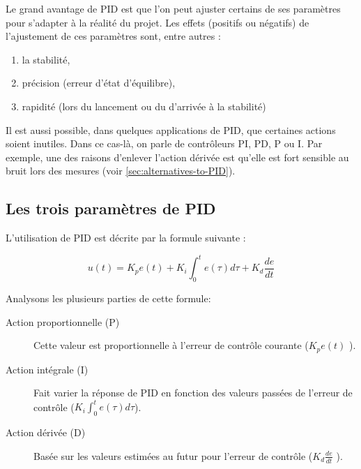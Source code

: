 Le grand avantage de PID est que l'on peut ajuster certains de ses paramètres pour s'adapter à la réalité du projet.
Les effets (positifs ou négatifs) de l'ajustement de ces paramètres sont, entre autres \cite{zhong2006pid} :
\begin{enumerate}
\item la stabilité,
\item précision (erreur d'état d'équilibre),
\item rapidité (lors du lancement ou du d'arrivée à la stabilité)
\end{enumerate}

Il est aussi possible, dans quelques applications de PID, que certaines actions soient inutiles.
Dans ce cas-là, on parle de contrôleurs PI, PD, P ou I.
Par exemple, une des raisons d'enlever l'action dérivée est qu'elle est fort sensible au bruit lors des mesures
(voir \ref{sec:alternatives-to-PID}).

\newpage

\subsection{Les trois paramètres de PID}

L'utilisation de PID est décrite par la formule suivante\cite{visioli2006practical} :

$$u(t) = K_p e(t) + K_i \int_{0}^{t} e(\tau) d\tau + K_d \frac{de}{dt}$$

Analysons les plusieurs parties de cette formule:

\begin{description}
\item[Action proportionnelle (P)]
	Cette valeur est proportionnelle à l'erreur de contrôle courante ($K_p e(t)$ ).
\item[Action intégrale (I)]
	Fait varier la réponse de PID en fonction des valeurs passées de l'erreur de contrôle ($K_i \int_{0}^{t} e(\tau) d\tau$).
\item[Action dérivée (D)]
	Basée sur les valeurs estimées au futur pour l'erreur de contrôle ($K_d \frac{de}{dt}$ ).
\end{description}